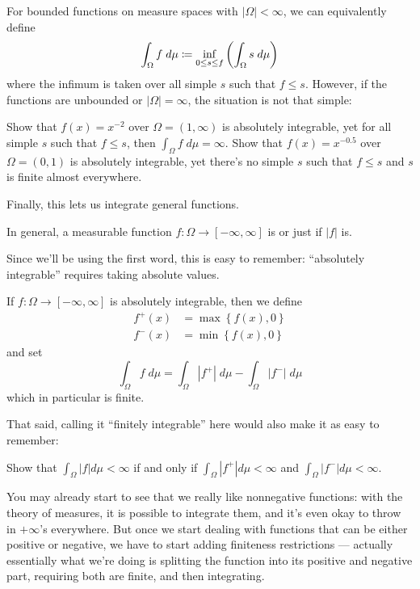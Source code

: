 \begin{remark}
	For bounded functions on measure spaces with $|\Omega| < \infty$, we can equivalently define
	\[ \int_\Omega f \; d\mu \coloneqq
		\inf_{0 \le s \le f} \left( \int_\Omega s \; d\mu \right) \]
	where the infimum is taken over all simple $s$ such that $f \leq s$.
	However, if the functions are unbounded or $|\Omega| = \infty$, the situation is not that simple:
	\begin{itemize}
		\ii Show that $f(x) = x^{-2}$ over $\Omega = (1, \infty)$ is absolutely integrable,
		yet for all simple $s$ such that $f \leq s$, then $\int_\Omega f \; d\mu = \infty$.
		\ii Show that $f(x) = x^{-0.5}$ over $\Omega = (0, 1)$ is absolutely integrable,
		yet there's no simple $s$ such that $f \leq s$ and $s$ is finite almost everywhere.
	\end{itemize}
\end{remark}

Finally, this lets us integrate general functions.
\begin{definition}
	In general, a measurable function $f \colon \Omega \to [-\infty, \infty]$
	is  or just  if $|f|$ is.
\end{definition}
Since we'll be using the first word, this is easy to remember:
``absolutely integrable'' requires taking absolute values.

\begin{step}
	If $f \colon \Omega \to [-\infty, \infty]$ is absolutely integrable,
	then we define
	\begin{align*}
		f^+(x) &= \max\left\{ f(x), 0 \right\} \\
		f^-(x) &= \min\left\{ f(x), 0 \right\}
	\end{align*}
	and set
	\[ \int_\Omega f \; d\mu = \int_\Omega |f^+| \; d\mu
		- \int_\Omega |f^-| \; d\mu \]
	which in particular is finite.
\end{step}

That said, calling it ``finitely integrable'' here would also make it as easy to remember:
\begin{exercise}
	Show that $\int_\Omega |f| d\mu < \infty$ if and only if
	$\int_\Omega |f^+| d\mu < \infty$ and
	$\int_\Omega |f^-| d\mu < \infty$.
\end{exercise}

You may already start to see that we really like nonnegative functions:
with the theory of measures, it is possible to integrate them,
and it's even okay to throw in $+\infty$'s everywhere.
But once we start dealing with functions that can be either positive or negative,
we have to start adding finiteness restrictions ---
actually essentially what we're doing is splitting
the function into its positive and negative part,
requiring both are finite, and then integrating.


